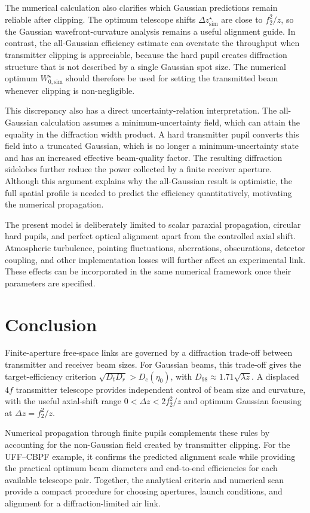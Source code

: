 \documentclass[a4paper,10pt]{article}
\begin{document}
The numerical calculation also clarifies which Gaussian predictions remain reliable after clipping. The optimum telescope shifts $\Delta z_{\mathrm{sim}}^\star$ are close to $f_2^2/z$, so the Gaussian wavefront-curvature analysis remains a useful alignment guide. In contrast, the all-Gaussian efficiency estimate can overstate the throughput when transmitter clipping is appreciable, because the hard pupil creates diffraction structure that is not described by a single Gaussian spot size. The numerical optimum $W_{0,\mathrm{sim}}^\star$ should therefore be used for setting the transmitted beam whenever clipping is non-negligible.

This discrepancy also has a direct uncertainty-relation interpretation. The all-Gaussian calculation assumes a minimum-uncertainty field, which can attain the equality in the diffraction width product. A hard transmitter pupil converts this field into a truncated Gaussian, which is no longer a minimum-uncertainty state and has an increased effective beam-quality factor. The resulting diffraction sidelobes further reduce the power collected by a finite receiver aperture. Although this argument explains why the all-Gaussian result is optimistic, the full spatial profile is needed to predict the efficiency quantitatively, motivating the numerical propagation.

The present model is deliberately limited to scalar paraxial propagation, circular hard pupils, and perfect optical alignment apart from the controlled axial shift. Atmospheric turbulence, pointing fluctuations, aberrations, obscurations, detector coupling, and other implementation losses will further affect an experimental link. These effects can be incorporated in the same numerical framework once their parameters are specified.

\section{Conclusion}

Finite-aperture free-space links are governed by a diffraction trade-off between transmitter and receiver beam sizes. For Gaussian beams, this trade-off gives the target-efficiency criterion $\sqrt{D_tD_r}>D_c(\eta_0)$, with $D_{98}\approx1.71\sqrt{\lambda z}$. A displaced $4f$ transmitter telescope provides independent control of beam size and curvature, with the useful axial-shift range $0<\Delta z<2f_2^2/z$ and optimum Gaussian focusing at $\Delta z=f_2^2/z$.

Numerical propagation through finite pupils complements these rules by accounting for the non-Gaussian field created by transmitter clipping. For the UFF--CBPF example, it confirms the predicted alignment scale while providing the practical optimum beam diameters and end-to-end efficiencies for each available telescope pair. Together, the analytical criteria and numerical scan provide a compact procedure for choosing apertures, launch conditions, and alignment for a diffraction-limited air link.



\end{document}
